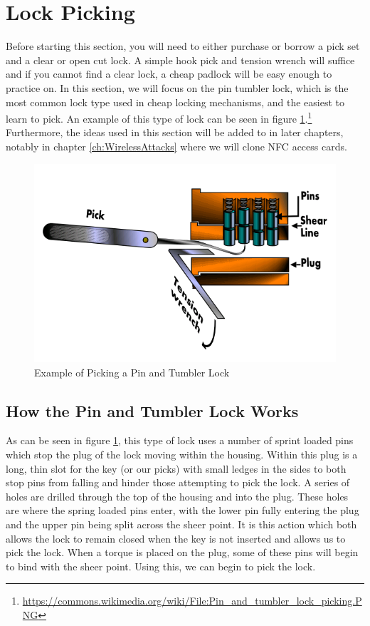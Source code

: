 \documentclass[a4paper,11pt]{report}
\begin{document}
	\section{Lock Picking}
		Before starting this section, you will need to either purchase or borrow a pick set and a clear or open cut lock. 
		A simple hook pick and tension wrench will suffice and if you cannot find a clear lock, a cheap padlock will be easy enough to practice on. 
		In this section, we will focus on the pin tumbler lock, which is the most common lock type used in cheap locking mechanisms, and the easiest to learn to pick. 
		An example of this type of lock can be seen in figure \ref{fig:PinTumblerLock}.\footnote{\url{https://commons.wikimedia.org/wiki/File:Pin\_and\_tumbler\_lock\_picking.PNG}}
		Furthermore, the ideas used in this section will be added to in later chapters, notably in chapter \ref{ch:WirelessAttacks} where we will clone NFC access cards. 
		\begin{figure}[htb]
			\includegraphics[scale=0.6]{./PinTumblerLock.png}
			\caption{Example of Picking a Pin and Tumbler Lock}
			\label{fig:PinTumblerLock}
		\end{figure}
		\subsection{How the Pin and Tumbler Lock Works}
			As can be seen in figure \ref{fig:PinTumblerLock}, this type of lock uses a number of sprint loaded pins which stop the plug of the lock moving within the housing. 
			Within this plug is a long, thin slot for the key (or our picks) with small ledges in the sides to both stop pins from falling and hinder those attempting to pick the lock. 
			A series of holes are drilled through the top of the housing and into the plug. 
			These holes are where the spring loaded pins enter, with the lower pin fully entering the plug and the upper pin being split across the sheer point. 
			It is this action which both allows the lock to remain closed when the key is not inserted and allows us to pick the lock. 
			When a torque is placed on the plug, some of these pins will begin to bind with the sheer point. 
			Using this, we can begin to pick the lock. 
\end{document}

